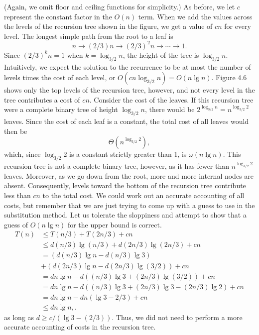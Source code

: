 \documentclass{report}
\begin{document}
        (Again, we omit floor and ceiling functions for simplicity.) As before, we let \( c \) represent the constant factor in the \( O(n) \) term. When we add the values across the levels of the recursion tree shown in the figure, we get a value of \( cn \) for every level.
        \bigbreak \noindent 
        The longest simple path from the root to a leaf is 
        \[
            n \to (2/3)n \to (2/3)^2n \to \cdots \to 1.
        \]
        Since \((2/3)^k n = 1\) when \(k = \log_{3/2} n\), the height of the tree is \(\log_{3/2} n\).
        \bigbreak \noindent 
        Intuitively, we expect the solution to the recurrence to be at most the number of levels times the cost of each level, or \(O(cn \log_{3/2} n) = O(n \lg n)\). Figure 4.6 shows only the top levels of the recursion tree, however, and not every level in the tree contributes a cost of \(cn\). Consider the cost of the leaves. If this recursion tree were a complete binary tree of height \(\log_{3/2} n\), there would be \(2^{\log_{3/2} n} = n^{\log_{3/2} 2}\) leaves. Since the cost of each leaf is a constant, the total cost of all leaves would then be 
        \[
            \Theta(n^{\log_{3/2} 2}),
        \]
        which, since \(\log_{3/2} 2\) is a constant strictly greater than 1, is \(\omega(n \lg n)\). This recursion tree is not a complete binary tree, however, as it has fewer than \(n^{\log_{3/2} 2}\) leaves. Moreover, as we go down from the root, more and more internal nodes are absent. Consequently, levels toward the bottom of the recursion tree contribute less than \(cn\) to the total cost. 
        \bigbreak \noindent 
        We could work out an accurate accounting of all costs, but remember that we are just trying to come up with a guess to use in the substitution method. Let us tolerate the sloppiness and attempt to show that a guess of \(O(n \lg n)\) for the upper bound is correct.
        \bigbreak \noindent 
        \begin{align*}
            T(n) &\leq T(n/3) + T(2n/3) + cn\\
                 &\leq d(n/3) \lg(n/3) + d(2n/3) \lg(2n/3) + cn\\
                 &= \left(d(n/3) \lg n - d(n/3) \lg 3\right) \\
                 &+ \left(d(2n/3) \lg n - d(2n/3) \lg(3/2)\right) + cn\\
                 &= d n \lg n - d\left((n/3) \lg 3 + (2n/3) \lg(3/2)\right) + cn\\
                 &= d n \lg n - d\left((n/3) \lg 3 + (2n/3) \lg 3 - (2n/3) \lg 2\right) + cn\\
                 &= d n \lg n - d n \left(\lg 3 - 2/3\right) + cn\\
                 &\leq d n \lg n,
        .\end{align*}
        as long as \( d \geq c / (\lg 3 - (2/3)) \). Thus, we did not need to perform a more accurate accounting of costs in the recursion tree.
        \bigbreak \noindent 
\end{document}
